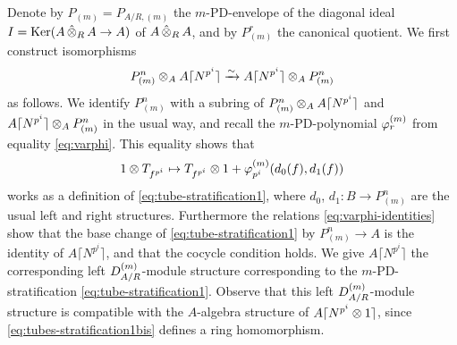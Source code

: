 \documentclass{article}
\theoremstyle{change}
\numberwithin{equation}{subsubsection}
\newcommand\lc{\lceil}
\newcommand\rc{\rceil}
\begin{document}
Denote by $P_{(m)}=P_{A/R,(m)}$ the $m$-PD-envelope of the diagonal
ideal $I={\operatorname{Ker}}(A\mathop{\hat\otimes}_RA\to A)$ of $A\mathop{\hat\otimes}_RA$, and by $P^r_{(m)}$
the canonical quotient. We first construct isomorphisms
\begin{equation}
  \label{eq:tube-stratification1}
  P^n_{(m)}\tens_AA\lc N^{p^i}\rc
  \isom
  A\lc N^{p^i}\rc\tens_AP^n_{(m)}  
\end{equation}
as follows. We identify $P^n_{(m)}$ with a subring of
$P^n_{(m)}\tens_AA\lc N^{p^i}\rc$ and
$A\lc N^{p^i}\rc\tens_AP^n_{(m)}$ in the usual way, and recall the
$m$-PD-polynomial ${\varphi}^{({m})}_r$ from equality
\ref{eq:varphi}. This equality shows that
\begin{equation}
  \label{eq:tubes-stratification1bis}
  1\otimes T_{f^{p^i}}\mapsto
  T_{f^{p^i}}\otimes1+{\varphi}^{({m})}_{p^i}(d_0(f),d_1(f))
\end{equation}
works as a definition of \ref{eq:tube-stratification1}, where $d_0$,
$d_1:B\to P^n_{(m)}$ are the usual left and right
structures. Furthermore the relations \ref{eq:varphi-identities} show
that the base change of \ref{eq:tube-stratification1} by
$P^n_{(m)}\to A$ is the identity of $A\lc N^{p^i}\rc$, and that the
cocycle condition holds. We give $A\lc N^{p^i}\rc$ the corresponding
left ${D}^{({m})}_{A/R}$-module structure corresponding to the
$m$-PD-stratification \ref{eq:tube-stratification1}. Observe that this
left ${D}^{({m})}_{A/R}$-module structure is compatible with the
$A$-algebra structure of $A\lc N^{p^i}\tens1\rc$, since
\ref{eq:tubes-stratification1bis} defines a ring homomorphism.
\end{document}
